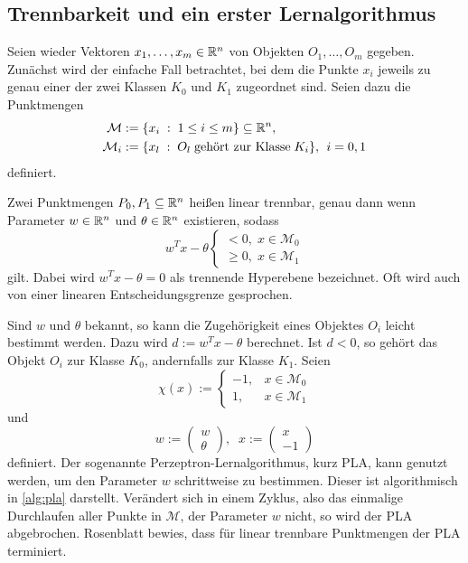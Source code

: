 \subsection{Trennbarkeit und ein erster Lernalgorithmus}
\label{abs:trenn}
Seien wieder Vektoren $x_1, \ldots, x_m \in \mathbb{R}^{n}$ von Objekten $O_1, \ldots, O_m$ gegeben. Zunächst wird der einfache Fall betrachtet, bei dem die Punkte $x_i$ jeweils zu genau einer der zwei Klassen $K_0$ und $K_{1}$ zugeordnet sind. Seien dazu die Punktmengen
\begin{align*}
    \mathcal{M} & :=\{x_i \; : \; 1 \leq i \leq m\} \subseteq \mathbb{R}^{n}, \\
    \mathcal{M}_i &:=\{x_l \; : \; O_l \; \text{gehört zur Klasse} \; K_i\}, \; \, i=0,1
\end{align*}
definiert.

\begin{defi}
    Zwei Punktmengen $P_0, P_{1} \subseteq \mathbb{R}^n$ heißen linear trennbar, genau dann wenn Parameter $w \in \mathbb{R}^n$ und $\theta \in \mathbb{R}^n$ existieren, sodass
    \begin{equation*}
        w^T x - \theta \begin{cases}
            <0, \; x \in \mathcal{M}_{0} \\
            \geq 0, \; x \in \mathcal{M}_1
        \end{cases}
    \end{equation*}
    gilt. Dabei wird $w^T x- \theta=0$ als trennende Hyperebene bezeichnet. Oft wird auch von einer linearen Entscheidungsgrenze gesprochen.
\end{defi}
Sind $w$ und $\theta$ bekannt, so kann die Zugehörigkeit eines Objektes $O_i$ leicht bestimmt werden. Dazu wird $d:=w^T x -\theta$ berechnet. Ist $d<0$, so gehört das Objekt $O_i$ zur Klasse $K_0$, andernfalls zur Klasse $K_1$. Seien 
\begin{equation*}
    \chi(x):= \begin{cases}
        -1,  &x \in \mathcal{M}_0 \\
        1,  &x \in \mathcal{M}_1
    \end{cases}
\end{equation*}
und \begin{equation*}
    w:= \begin{pmatrix}
    w \\
    \theta    
    \end{pmatrix}, \; \; x:=\begin{pmatrix}
        x \\
        -1
    \end{pmatrix} 
\end{equation*}
definiert.
Der sogenannte Perzeptron-Lernalgorithmus\cite{rosenblatt1958perceptron}, kurz PLA, kann genutzt werden, um den Parameter $w$ schrittweise zu bestimmen. Dieser ist algorithmisch in \ref{alg:pla} darstellt. Verändert sich in einem Zyklus, also das einmalige Durchlaufen aller Punkte in $\mathcal{M}$, der Parameter $w$ nicht, so wird der PLA abgebrochen.
Rosenblatt\cite{rosenblatt1958perceptron} bewies, dass für linear trennbare Punktmengen der PLA terminiert.

